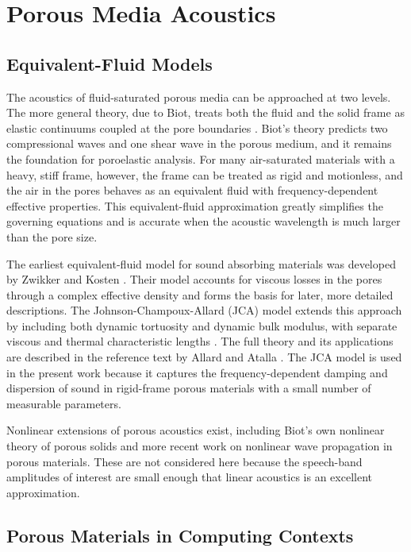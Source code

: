 \section{Porous Media Acoustics}
\label{sec:lit_porous}

\subsection{Equivalent-Fluid Models}

The acoustics of fluid-saturated porous media can be approached at two levels. The more general theory, due to Biot, treats both the fluid and the solid frame as elastic continuums coupled at the pore boundaries \cite{biot1956theory}. Biot's theory predicts two compressional waves and one shear wave in the porous medium, and it remains the foundation for poroelastic analysis. For many air-saturated materials with a heavy, stiff frame, however, the frame can be treated as rigid and motionless, and the air in the pores behaves as an equivalent fluid with frequency-dependent effective properties. This equivalent-fluid approximation greatly simplifies the governing equations and is accurate when the acoustic wavelength is much larger than the pore size.

The earliest equivalent-fluid model for sound absorbing materials was developed by Zwikker and Kosten \cite{zwikker1949sound}. Their model accounts for viscous losses in the pores through a complex effective density and forms the basis for later, more detailed descriptions. The Johnson-Champoux-Allard (JCA) model extends this approach by including both dynamic tortuosity and dynamic bulk modulus, with separate viscous and thermal characteristic lengths \cite{johnson1987dynamic, champoux1991dynamic}. The full theory and its applications are described in the reference text by Allard and Atalla \cite{allard2009propagation}. The JCA model is used in the present work because it captures the frequency-dependent damping and dispersion of sound in rigid-frame porous materials with a small number of measurable parameters.

Nonlinear extensions of porous acoustics exist, including Biot's own nonlinear theory of porous solids \cite{biot1973nonlinear} and more recent work on nonlinear wave propagation in porous materials. These are not considered here because the speech-band amplitudes of interest are small enough that linear acoustics is an excellent approximation.

\subsection{Porous Materials in Computing Contexts}

